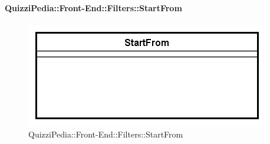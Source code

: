 \paragraph[QuizziPedia::Front-End::Filters::StartFrom]{QuizziPedia::Front-End::Filters::StartFrom}
\begin{figure} [ht]
	\centering
	\includegraphics[scale=0.80]{UML/Classi/Front-End/QuizziPedia_Front-end_Filters_StartFrom.png}
	\caption{QuizziPedia::Front-End::Filters::StartFrom}
\end{figure} \FloatBarrier
